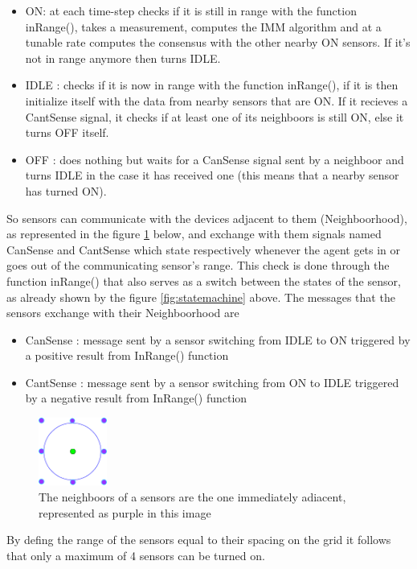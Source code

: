 \documentclass[twocolumn]{article}
\begin{document}
\begin{itemize}
    \item ON: at each time-step checks if it is still in range with the function inRange(), takes a measurement, computes the IMM algorithm and
          at a tunable rate computes the consensus with the other nearby ON sensors. If it's not in range anymore then turns IDLE.
    \item IDLE : checks if it is now in range with the function inRange(), if it is then initialize itself with the data from nearby sensors
          that are ON. If it recieves a CantSense signal, it checks if at least one of its neighboors is still ON, else it turns OFF itself.
    \item OFF : does nothing but waits for a CanSense signal sent by a neighboor and turns IDLE in the case it has received one (this means that
          a nearby sensor has turned ON).
\end{itemize}
So sensors can communicate with the devices adjacent to them (Neighboorhood), as represented in the figure \ref{fig:neighboors} below,
and exchange with them signals named CanSense and CantSense which state respectively whenever the agent gets in or goes out of the
communicating sensor's range. This check is done through the function inRange() that also serves as a switch between the states of the
sensor, as already shown by the figure \ref{fig:statemachine} above.
The messages that the sensors exchange with their Neighboorhood are
\begin{itemize}
    \item CanSense : message sent by a sensor switching from IDLE to ON triggered by a positive result from InRange() function
    \item CantSense : message sent by a sensor switching from ON to IDLE triggered by a negative result from InRange() function
\end{itemize}
\begin{figure}[h!]
    \centering
    \includegraphics[width=0.2\textwidth]{Immagini/2sensor.png}
    \caption{The neighboors of a sensors are the one immediately adiacent, represented as purple in this image}
    \label{fig:neighboors}
\end{figure}
By defing the range of the sensors equal to their spacing on the grid it follows that only a maximum of 4 sensors can be turned on.
\end{document}
